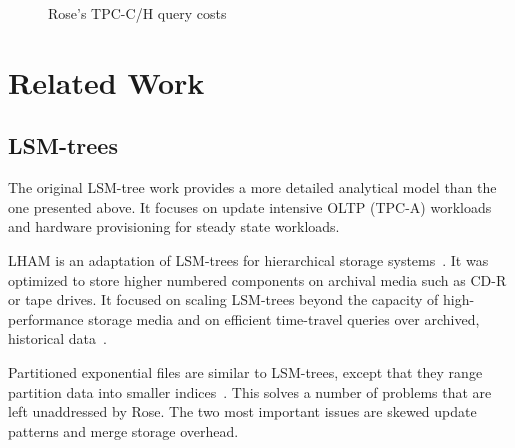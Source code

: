\documentclass{vldb}
\newcommand{\rows}{Rose\xspace}
\newcommand{\rowss}{Rose's\xspace}
\begin{document}
\begin{figure}
\centering {}
\caption{\rowss TPC-C/H query costs}
\label{fig:tpch}
\end{figure}




\section{Related Work}

\subsection{LSM-trees}

The original LSM-tree work\cite{lsm} provides a more detailed
analytical model than the one presented above.  It focuses on update
intensive OLTP (TPC-A) workloads and hardware provisioning for steady
state workloads.

LHAM is an adaptation of LSM-trees for hierarchical storage
systems~\cite{lham}.  It was optimized to store higher numbered
components on archival media such as CD-R or tape drives.  It focused
on scaling LSM-trees beyond the capacity of high-performance storage
media and on efficient time-travel queries over archived, historical
data~\cite{lham}.

Partitioned exponential files are similar to LSM-trees, except that
they range partition data into smaller indices~\cite{partexp}.  This solves a number
of problems that are left unaddressed by \rows.  The two most
important issues are skewed update patterns and merge storage
overhead.
\end{document}
